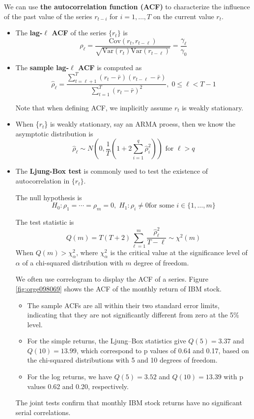 \documentclass[a4paper,11pt]{article}
\newcommand{\var}{\mathrm{Var}}
\newcommand{\cov}{\mathrm{Cov}}
\begin{document}
We can use \textbf{the autocorrelation function (ACF)} to characterize the
influence of the past value of the series \(r_{t-i}\) for \(i = 1,
\ldots, T\) on the current value \(r_t\).

\begin{itemize}
\item The \textbf{lag-\(\ell\) ACF} of the series \(\{r_t\}\) is
\[ \rho_{\ell} = \frac{\cov(r_t, r_{t-\ell})}{\sqrt{\var(r_t)\var(r_{t-\ell})}} = \frac{\gamma_{\ell}}{\gamma_0} \]

\item The \textbf{sample lag-\(\ell\) ACF} is computed as
\[ \hat{\rho}_{\ell} = \frac{\sum_{t=\ell+1}^T (r_t -
  \bar{r})(r_{t-\ell} - \bar{r})}{\sum_{t=1}^T (r_t - \bar{r})^2},\; 0
  \leq \ell < T-1 \]

Note that when defining ACF, we implicitly assume \(r_t\) is weakly
stationary.

\item When \{\(r_t\)\} is weakly stationary, say an ARMA proess, then we know
the asymptotic distribution is 
\[ \hat{\rho}_{\ell} \sim N \left(0, \frac{1}{T}(1+2\sum_{i=1}^q
  \hat{\rho}_i^2) \right) \text{ for } \ell > q \]

\item The \textbf{Ljung-Box test} is commonly used to test the existence of
autocorrelation in \(\{r_t\}\).

The null hypothesis is
\[ H_0: \rho_1 = \cdots = \rho_m = 0,\; H_1: \rho_i \neq 0 \text{
  for some } i \in \{1, \ldots, m\} \]

The test statistic is
\[ Q(m) = T(T+2)\sum_{\ell=1}^m \frac{\hat{\rho}^2_{\ell}}{T-\ell}
  \sim \chi^2(m) \]
When \(Q(m) > \chi^2_{\alpha}\), where \(\chi^2_{\alpha}\) is the
critical value at the significance level of \(\alpha\) of a
chi-squared distribution with \(m\) degree of freedom.

We often use correlogram to display the ACF of a series. Figure
\ref{fig:orge098069} shows the ACF of the monthly return of IBM
stock. 
\begin{itemize}
\item The sample ACFs are all within their two standard error
limits, indicating that they are not significantly different from
zero at the 5\% level.
\item For the simple returns, the Ljung–Box statistics give \(Q(5) =
    3.37\) and \(Q(10) = 13.99\), which correspond to p values of 0.64
and 0.17, based on the chi-squared distributions with 5 and 10
degrees of freedom.
\item For the log returns, we have \(Q(5) = 3.52\) and \(Q(10) = 13.39\)
with p values 0.62 and 0.20, respectively.
\end{itemize}
The joint tests confirm that monthly IBM stock returns have no
significant serial correlations.


\end{itemize}
\end{document}
